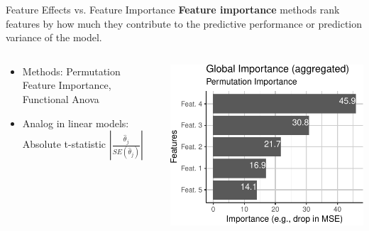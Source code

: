 \documentclass[11pt,compress,t,notes=noshow, xcolor=table]{beamer}
\begin{document}
\begin{vbframe}{Feature Effects vs. Feature Importance}
\textbf{Feature importance} methods rank features by how much they contribute to the predictive performance or prediction variance of the model.
\begin{columns}
\begin{column}{0.6\textwidth}
\begin{itemize}
    \itemsep1em
    \item Methods: Permutation Feature Importance, Functional Anova
    \item Analog in linear models: Absolute t-statistic $\left|\frac{\hat{\theta}_j}{SE(\hat{\theta}_j)}\right|$
\end{itemize}
\end{column}
\begin{column}{0.4\textwidth}
\begin{center}
\includegraphics[page=1, width=\textwidth]{figure_man/feature-importance}
\end{center}
\end{column}
\end{columns}
\end{vbframe}
\end{document}
